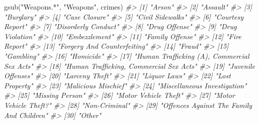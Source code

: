 \documentclass[
]{krantz}
\makeatletter
\newenvironment{Shaded}{\begin{snugshade}}{\end{snugshade}}
\newcommand{\CommentTok}[1]{\textcolor[rgb]{0.37,0.37,0.37}{\textit{#1}}}
\newcommand{\FunctionTok}[1]{\textcolor[rgb]{0,0,0}{#1}}
\newcommand{\NormalTok}[1]{#1}
\newcommand{\StringTok}[1]{\textcolor[rgb]{0.5,0.5,0.5}{#1}}
\newenvironment{kframe}{%
\medskip{}
\setlength{\fboxsep}{.8em}
 \def\at@end@of@kframe{}%
 \ifinner\ifhmode%
  \def\at@end@of@kframe{\end{minipage}}%
  \begin{minipage}{\columnwidth}%
 \fi\fi%
 \def\FrameCommand##1{\hskip\@totalleftmargin \hskip-\fboxsep
 \colorbox{shadecolor}{##1}\hskip-\fboxsep
     \hskip-\linewidth \hskip-\@totalleftmargin \hskip\columnwidth}%
 \MakeFramed {\advance\hsize-\width
   \@totalleftmargin\z@ \linewidth\hsize
   \@setminipage}}%
 {\par\unskip\endMakeFramed%
 \at@end@of@kframe}
\renewenvironment{Shaded}{\begin{kframe}}{\end{kframe}}
\makeatother
\begin{document}
\begin{Shaded}
\begin{Highlighting}[]
\FunctionTok{gsub}\NormalTok{(}\StringTok{"Weapons.*"}\NormalTok{, }\StringTok{"Weapons"}\NormalTok{, crimes)}
\CommentTok{\#\textgreater{}  [1] "Arson"                                     }
\CommentTok{\#\textgreater{}  [2] "Assault"                                   }
\CommentTok{\#\textgreater{}  [3] "Burglary"                                  }
\CommentTok{\#\textgreater{}  [4] "Case Closure"                              }
\CommentTok{\#\textgreater{}  [5] "Civil Sidewalks"                           }
\CommentTok{\#\textgreater{}  [6] "Courtesy Report"                           }
\CommentTok{\#\textgreater{}  [7] "Disorderly Conduct"                        }
\CommentTok{\#\textgreater{}  [8] "Drug Offense"                              }
\CommentTok{\#\textgreater{}  [9] "Drug Violation"                            }
\CommentTok{\#\textgreater{} [10] "Embezzlement"                              }
\CommentTok{\#\textgreater{} [11] "Family Offense"                            }
\CommentTok{\#\textgreater{} [12] "Fire Report"                               }
\CommentTok{\#\textgreater{} [13] "Forgery And Counterfeiting"                }
\CommentTok{\#\textgreater{} [14] "Fraud"                                     }
\CommentTok{\#\textgreater{} [15] "Gambling"                                  }
\CommentTok{\#\textgreater{} [16] "Homicide"                                  }
\CommentTok{\#\textgreater{} [17] "Human Trafficking (A), Commercial Sex Acts"}
\CommentTok{\#\textgreater{} [18] "Human Trafficking, Commercial Sex Acts"    }
\CommentTok{\#\textgreater{} [19] "Juvenile Offenses"                         }
\CommentTok{\#\textgreater{} [20] "Larceny Theft"                             }
\CommentTok{\#\textgreater{} [21] "Liquor Laws"                               }
\CommentTok{\#\textgreater{} [22] "Lost Property"                             }
\CommentTok{\#\textgreater{} [23] "Malicious Mischief"                        }
\CommentTok{\#\textgreater{} [24] "Miscellaneous Investigation"               }
\CommentTok{\#\textgreater{} [25] "Missing Person"                            }
\CommentTok{\#\textgreater{} [26] "Motor Vehicle Theft"                       }
\CommentTok{\#\textgreater{} [27] "Motor Vehicle Theft?"                      }
\CommentTok{\#\textgreater{} [28] "Non{-}Criminal"                              }
\CommentTok{\#\textgreater{} [29] "Offences Against The Family And Children"  }
\CommentTok{\#\textgreater{} [30] "Other"                                     }

\end{Highlighting}
\end{Shaded}
\end{document}
